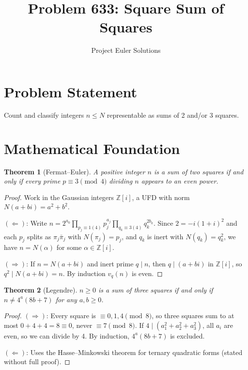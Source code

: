 \documentclass[11pt]{article}
\title{Problem 633: Square Sum of Squares}
\author{Project Euler Solutions}
\date{}
\newtheorem{theorem}{Theorem}
\begin{document}
\maketitle

\section{Problem Statement}

Count and classify integers $n \le N$ representable as sums of 2 and/or 3 squares.

\section{Mathematical Foundation}

\begin{theorem}[Fermat--Euler]
A positive integer $n$ is a sum of two squares if and only if every prime $p \equiv 3 \pmod{4}$ dividing $n$ appears to an even power.
\end{theorem}

\begin{proof}
Work in the Gaussian integers $\mathbb{Z}[i]$, a UFD with norm $N(a+bi)=a^2+b^2$.

$(\Leftarrow)$: Write $n = 2^{a_0}\prod_{p_j\equiv 1(4)}p_j^{a_j}\prod_{q_k\equiv 3(4)}q_k^{2b_k}$. Since $2 = -i(1+i)^2$ and each $p_j$ splits as $\pi_j\bar\pi_j$ with $N(\pi_j)=p_j$, and $q_k$ is inert with $N(q_k)=q_k^2$, we have $n = N(\alpha)$ for some $\alpha\in\mathbb{Z}[i]$.

$(\Rightarrow)$: If $n = N(a+bi)$ and inert prime $q\mid n$, then $q\mid(a+bi)$ in $\mathbb{Z}[i]$, so $q^2\mid N(a+bi)=n$. By induction $v_q(n)$ is even.
\end{proof}

\begin{theorem}[Legendre]
$n \ge 0$ is a sum of three squares if and only if $n \ne 4^a(8b+7)$ for any $a,b\ge 0$.
\end{theorem}

\begin{proof}
$(\Rightarrow)$: Every square is $\equiv 0,1,4\pmod{8}$, so three squares sum to at most $0{+}4{+}4=8\equiv 0$, never $\equiv 7\pmod 8$. If $4\mid (a_1^2+a_2^2+a_3^2)$, all $a_i$ are even, so we can divide by 4. By induction, $4^a(8b+7)$ is excluded.

$(\Leftarrow)$: Uses the Hasse--Minkowski theorem for ternary quadratic forms (stated without full proof).
\end{proof}
\end{document}
